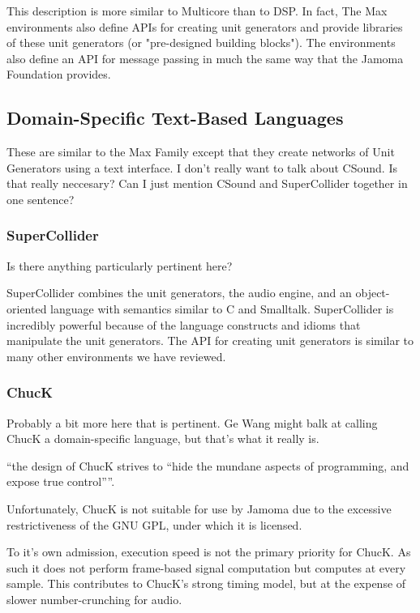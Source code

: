 \documentclass[twoside,10pt]{article}
\begin{document}
This description is more similar to Multicore than to DSP.  In fact, The Max environments also define APIs for creating unit generators and provide libraries of these unit generators (or "pre-designed building blocks").  The environments also define an API for message passing in much the same way that the Jamoma Foundation provides.


\subsection{Domain-Specific Text-Based Languages} %

These are similar to the Max Family except that they create networks of Unit Generators using a text interface.  I don't really want to talk about CSound.  Is that really neccesary?  Can I just mention CSound and SuperCollider together in one sentence?


\subsubsection{SuperCollider} %

Is there anything particularly pertinent here?\cite{McCartney:1996}

SuperCollider combines the unit generators, the audio engine, and an object-oriented language with semantics similar to C and Smalltalk.  SuperCollider is incredibly powerful because of the language constructs and idioms that manipulate the unit generators.  The API for creating unit generators is similar to many other environments we have reviewed.


\subsubsection{ChucK} %

Probably a bit more here that is pertinent.  Ge Wang might balk at calling ChucK a domain-specific language, but that's what it really is.

``the design of ChucK strives to “hide the mundane aspects of programming, and expose true control”''\cite{wang:2008}.

Unfortunately, ChucK is not suitable for use by Jamoma due to the excessive restrictiveness of the GNU GPL, under which it is licensed.

To it's own admission, execution speed is not the primary priority for ChucK.  As such it does not perform frame-based signal computation but computes at every sample.  This contributes to ChucK's strong timing model, but at the expense of slower number-crunching for audio.
\end{document}
